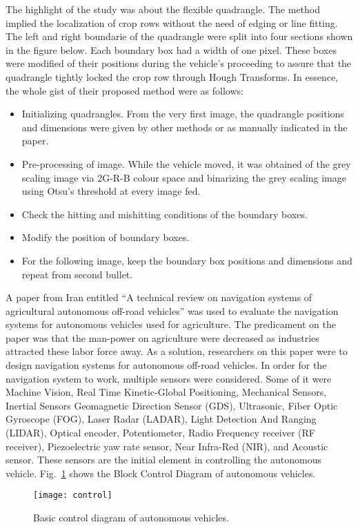     The highlight of the study was about the flexible quadrangle. The method implied the localization of crop rows without the need of edging or line fitting. The left and right boundarie of the quadrangle were split into four sections shown in the figure below. Each boundary box had a width of one pixel. These boxes were modified of their positions during the vehicle’s proceeding to assure that the quadrangle tightly locked the crop row through Hough Transforms. In essence, the whole gist of their proposed method were as follows:
    \begin{itemize}
\item Initializing quadrangles. From the very first image, the quadrangle positions and dimensions were given by other methods or as manually indicated in the paper.
\item Pre-processing of image. While the vehicle moved, it was obtained of the grey scaling image via 2G-R-B colour space and binarizing the grey scaling image using Otsu’s threshold at every image fed.
\item Check the hitting and mishitting conditions of the boundary boxes.
\item Modify the position of boundary boxes.
\item For the following image, keep the boundary box positions and dimensions and repeat from second bullet.
\end{itemize}

A paper from Iran entitled “A technical review on navigation systems of agricultural autonomous off-road vehicles” was used to evaluate the navigation systems for autonomous vehicles used for agriculture. The predicament on the paper was that the man-power on agriculture were decreased as industries attracted these labor force away. As a solution, researchers on this paper were to design navigation systems for autonomous off-road vehicles. In order for the navigation system to work, multiple sensors were considered. Some of it were Machine Vision, Real Time Kinetic-Global Positioning, Mechanical Sensors, Inertial Sensors Geomagnetic Direction Sensor (GDS), Ultrasonic, Fiber Optic Gyroscope (FOG), Laser Radar (LADAR), Light Detection And Ranging (LIDAR), Optical encoder, Potentiometer, Radio Frequency receiver (RF receiver), Piezoelectric yaw rate sensor, Near Infra-Red (NIR), and Acoustic sensor. These sensors are the initial element in controlling the autonomous vehicle. Fig.~\ref{fig:con} shows the Block Control Diagram of autonomous vehicles.

\begin{figure}[!h]
	\centering
	\texttt{[image: control]}
	\caption{Basic control diagram of autonomous vehicles.}
	\label{fig:con}
\end{figure}

